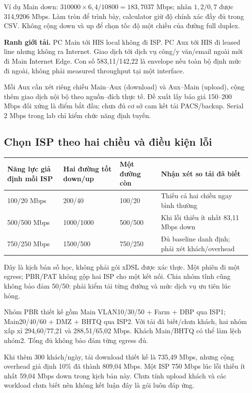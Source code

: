 \documentclass[
  11pt,
]{article}
\begin{document}
Ví dụ Main down: $310000\times6,4/10800=183,7037$ Mbps; nhân $1,2/0,7$ được 314,9206 Mbps. Làm tròn để trình bày, calculator giữ độ chính xác đầy đủ trong CSV. Không cộng down và up để chọn tốc độ một chiều của đường full duplex.

\textbf{Ranh giới tải.} PC Main tới HIS local không đi ISP. PC Aux tới HIS đi leased line nhưng không ra Internet. Giao dịch tới dịch vụ công/y văn/email ngoài mới đi Main Internet Edge. Con số 583,11/142,22 là envelope nếu toàn bộ định mức đi ngoài, không phải measured throughput tại một interface.

Mỗi Aux cần xét riêng chiều Main--Aux (download) và Aux--Main (upload), cộng thêm giao dịch nội bộ theo nguồn--đích thực tế. Đề xuất lấy báo giá 150--200 Mbps đối xứng là điểm bắt đầu; chưa đủ cơ sở cam kết tải PACS/backup. Serial 2 Mbps trong lab chỉ kiểm chức năng định tuyến.

\clearpage
\subsection{Chọn ISP theo hai chiều và điều kiện lỗi}
\par\noindent
{}
\begin{tabularx}{\linewidth}{@{}lXXX@{}}\toprule
Năng lực giả định mỗi ISP & Hai đường tốt down/up & Một đường còn & Nhận xét so tải đã biết\\\midrule
100/20 Mbps & 200/40 & 100/20 & Thiếu cả hai chiều ngay bình thường\\
500/500 Mbps & 1000/1000 & 500/500 & Khi lỗi thiếu ít nhất 83,11 Mbps down\\
750/250 Mbps & 1500/500 & 750/250 & Đủ baseline danh định; phải xét khách/overhead\\\bottomrule\end{tabularx}\par

Đây là kịch bản số học, không phải gói xDSL được xác thực. Một phiên đi một egress; PBR/PAT không gộp hai ISP cho một kết nối. Chia nhóm tĩnh cũng không bảo đảm 50/50: phải kiểm tải từng đường và mức dịch vụ ưu tiên lúc hỏng.

Nhóm PBR thiết kế gồm Main VLAN10/30/50 + Farm + DBP qua ISP1; Main20/40/60 + DMZ + BHTQ qua ISP2. Với tải đã biết/chưa khách, hai nhóm xấp xỉ 294,60/77,21 và 288,51/65,02 Mbps. Khách Main/BHTQ có thể làm lệch nhóm2. Tổng đủ không bảo đảm từng egress đủ.

Khi thêm 300 khách/ngày, tải download thiết kế là 735,49 Mbps, nhưng cộng overhead giả định 10\% đã thành 809,04 Mbps. Một ISP 750 Mbps lúc lỗi thiếu ít nhất 59,04 Mbps down trong kịch bản này. Chưa tính upload khách và các workload chưa biết nên không kết luận đây là gói luôn đáp ứng.
\end{document}
